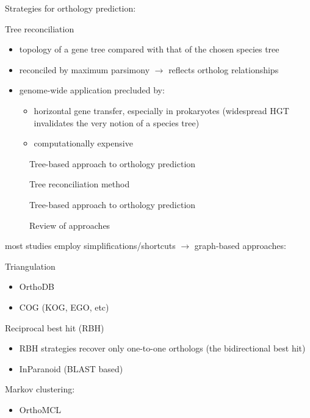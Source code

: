 
Strategies for orthology prediction:

Tree reconciliation

\begin{itemize}
	\item topology of a gene tree compared with that of the chosen species tree
	\item reconciled by maximum parsimony $\rightarrow$ reflects ortholog
		relationships
	\item genome-wide application precluded by:
	\begin{itemize}
		\item horizontal gene transfer, especially in prokaryotes (widespread HGT
			invalidates the very notion of a species tree)
		\item computationally expensive
	\end{itemize}
\end{itemize}

\begin{description}
	\item[\cite{mirkin1995}] Tree-based approach to orthology prediction
	\item[\cite{page1998}] Tree reconciliation method
	\item[\cite{yuan1998}] Tree-based approach to orthology prediction
	\item[\cite{kuzniar2008}] Review of approaches
\end{description}

most studies employ simplifications/shortcuts $\rightarrow$ graph-based approaches:

Triangulation

\begin{itemize}
	\item OrthoDB 
	\item COG (KOG, EGO, etc)
\end{itemize}

Reciprocal best hit (RBH) 

\begin{itemize}
	\item RBH strategies recover only one-to-one orthologs (the bidirectional best
		hit)
	\item InParanoid (BLAST based)
\end{itemize}

Markov clustering:

\begin{itemize}
	\item OrthoMCL
\end{itemize}

